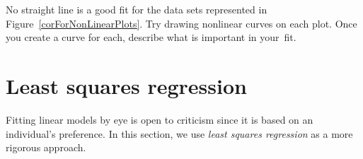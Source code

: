 \begin{exercisewrap}
\begin{nexercise}
No straight line is a good fit for the data sets
represented in Figure~\ref{corForNonLinearPlots}.
Try drawing nonlinear curves on each plot.
Once you create a curve for each, describe what is important
in your~fit.\footnotemark{}
\end{nexercise}
\end{exercisewrap}

%


{}







\section{Least squares regression}
\label{fittingALineByLSR}


Fitting linear models by eye is open to criticism since
it is based on an individual's preference.
In this section, we use \emph{least squares regression}
as a more rigorous approach.


